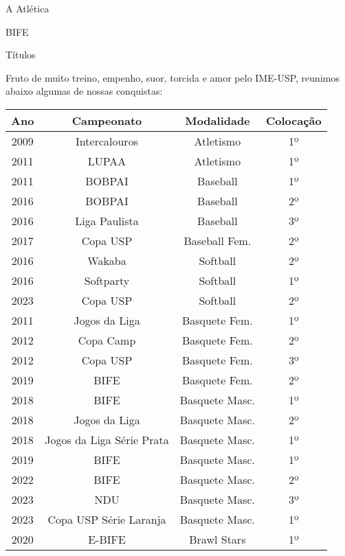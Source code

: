 \begin{secao}{A Atlética}
\begin{subsecao}{BIFE}
\end{subsecao}

\begin{subsecao}{Títulos}

Fruto de muito treino, empenho, suor, torcida e amor pelo IME-USP, reunimos
abaixo algumas de nossas conquistas:

\begin{center}
  \begin{tabular}{|c|c|c|c|}
    \hline
    Ano & Campeonato & Modalidade & Colocação\\
    \hline
    2009 & Intercalouros  & Atletismo       & 1º\\
    2011 & LUPAA          & Atletismo       & 1º\\
    2011 & BOBPAI         & Baseball        & 1º\\
    2016 & BOBPAI         & Baseball        & 2º\\
    2016 & Liga Paulista  & Baseball        & 3º\\
    2017 & Copa USP       & Baseball Fem.   & 2º\\
    2016 & Wakaba         & Softball        & 2º\\
    2016 & Softparty      & Softball        & 1º\\
    2023 & Copa USP       & Softball        & 2º\\
    2011 & Jogos da Liga  & Basquete Fem.   & 1º\\
    2012 & Copa Camp      & Basquete Fem.   & 2º\\
    2012 & Copa USP       & Basquete Fem.   & 3º\\
    2019 & BIFE           & Basquete Fem.   & 2º\\
    2018 & BIFE           & Basquete Masc.  & 1º\\
    2018 & Jogos da Liga  & Basquete Masc.  & 2º\\
    2018 & Jogos da Liga Série Prata & Basquete Masc. & 1º\\
    2019 & BIFE           & Basquete Masc.  & 1º\\
    2022 & BIFE           & Basquete Masc.  & 2º\\
    2023 & NDU            & Basquete Masc.  & 3º\\
    2023 & Copa USP Série Laranja & Basquete Masc. & 1º\\
    2020 & E-BIFE         & Brawl Stars     & 1º\\

\end{tabular}
\end{center}
\end{subsecao}
\end{secao}
